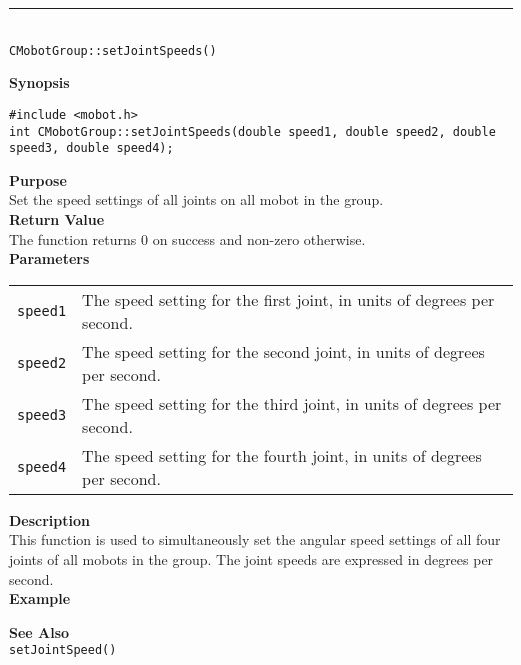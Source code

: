 \noindent
\vspace{5pt}
\rule{4.5in}{0.015in}\\
\noindent
{\LARGE \texttt{CMobotGroup::setJointSpeeds()}}\\
{}

\noindent
{\bf Synopsis}
\vspace{-8pt}
\begin{verbatim}
#include <mobot.h>
int CMobotGroup::setJointSpeeds(double speed1, double speed2, double speed3, double speed4);
\end{verbatim}

\noindent
{\bf Purpose}\\
Set the speed settings of all joints on all mobot in the group.\\

\noindent
{\bf Return Value}\\
The function returns 0 on success and non-zero otherwise.\\

\noindent
{\bf Parameters}
\vspace{-0.1in}
\begin{description}
\item               
\begin{tabular}{p{10 mm}p{145 mm}}
\texttt{speed1} & The speed setting for the first joint, in units of degrees per second. \\
\texttt{speed2} & The speed setting for the second joint, in units of degrees per second. \\
\texttt{speed3} & The speed setting for the third joint, in units of degrees per second. \\
\texttt{speed4} & The speed setting for the fourth joint, in units of degrees per second. \\
\end{tabular}
\end{description}

\noindent
{\bf Description}\\
This function is used to simultaneously set the angular speed settings of
all four joints of all mobots in the group. The joint speeds are expressed in
degrees per second. \\

\noindent
{\bf Example}\\
\noindent

\noindent
{\bf See Also}\\
\texttt{setJointSpeed()}


